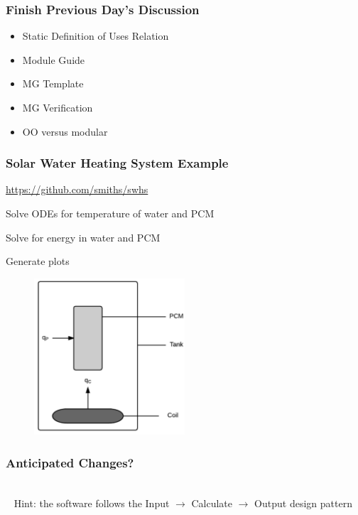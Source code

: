 \documentclass[t, 12pt, numbers, fleqn, handout]{beamer}
\begin{document}

\begin{frame}
\frametitle{Finish Previous Day's Discussion}
\begin{itemize}
\item Static Definition of Uses Relation
\item Module Guide
\item MG Template
\item MG Verification
\item OO versus modular
\end{itemize}
\end{frame}


\begin{frame}
\frametitle{Solar Water Heating System Example}

\bi
\item \href{https://github.com/smiths/swhs}{https://github.com/smiths/swhs}
\item Solve ODEs for temperature of water and PCM
\item Solve for energy in water and PCM
\item Generate plots
\ei

\begin{figure}
{
\includegraphics[width=0.5\textwidth]{../Figures/Tank.pdf}
}
\end{figure}

\end{frame}


\begin{frame}
\frametitle{Anticipated Changes?}

\\
~\newline
Hint: the software follows the Input $\rightarrow$ Calculate $\rightarrow$
Output design pattern

\end{frame}
\end{document}
